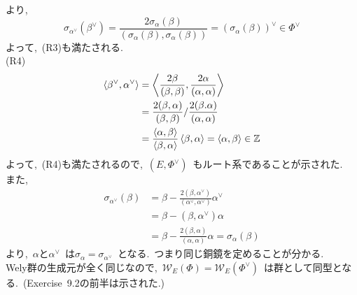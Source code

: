 \documentclass[uplatex,dvipdfmx]{jsarticle}
\begin{document}
より,~
\begin{equation*}
    \sigma_{\alpha^\vee}(\beta^\vee) = \frac{2\sigma_\alpha(\beta)}{(\sigma_\alpha(\beta), \sigma_\alpha(\beta))} = (\sigma_\alpha(\beta))^\vee \in \Phi^\vee
\end{equation*}
よって,~(R3)も満たされる.\\
(R4)~
\begin{equation*}
    \begin{split}
        \ev{\beta^\vee, \alpha^\vee} &= \ev{\frac{2\beta}{(\beta, \beta)}, \frac{2\alpha}{(\alpha, \alpha)}}\\
        &= \frac{2(\beta,\alpha)}{(\beta,\beta)}/\frac{2(\beta.\alpha)}{(\alpha, \alpha)}\\
        &= \frac{\ev{\alpha, \beta}}{\ev{\beta, \alpha}}\ev{\beta,\alpha} = \ev{\alpha, \beta} \in \mathbb{Z}
    \end{split}
\end{equation*}
よって,~(R4)も満たされるので,~$(E, \Phi^\vee)$~もルート系であることが示された.\\
また,~
\begin{equation*}
    \begin{split}
        \sigma_{\alpha^\vee}(\beta) &= \beta - \frac{2(\beta,\alpha^\vee)}{(\alpha^\vee, \alpha^\vee)}\alpha^\vee\\
        &= \beta - (\beta, \alpha^\vee)\alpha\\
        &= \beta -\frac{2(\beta,\alpha)}{(\alpha, \alpha)}\alpha = \sigma_\alpha(\beta)
    \end{split}
\end{equation*}
より,~$\alpha$と$\alpha^\vee$~は$\sigma_\alpha=\sigma_{\alpha^\vee}$~となる.~つまり同じ銅鏡を定めることが分かる.\\
Wely群の生成元が全く同じなので,~$\mathcal{W}_E(\Phi) = \mathcal{W}_E(\Phi^\vee)$~は群として同型となる.~(Exercise~9.2の前半は示された.)\\
\newpage
\end{document}
